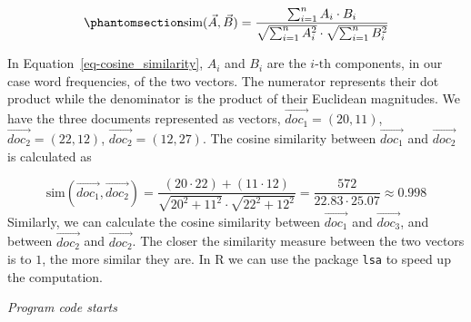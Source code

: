 \begin{equation}\phantomsection\label{eq-cosine_similarity}{
\text{sim}(\vec{A}, \vec{B}) = \frac{\sum_{i=1}^n A_i \cdot B_i}{\sqrt{\sum_{i=1}^n A_i^2} \cdot \sqrt{\sum_{i=1}^n B_i^2}}
}\end{equation}

In Equation~\ref{eq-cosine_similarity}, \(A_i\) and \(B_i\) are the
\(i\text{-th}\) components, in our case word frequencies, of the two
vectors. The numerator represents their dot product while the
denominator is the product of their Euclidean magnitudes. We have the
three documents represented as vectors, \(\vec{doc_1} = (20, 11)\),
\(\vec{doc_2} = (22, 12)\), \(\vec{doc_2} = (12, 27)\). The cosine
similarity between \(\vec{doc_1}\) and \(\vec{doc_2}\) is calculated
as

\[
\text{sim}(\vec{doc_1}, \vec{doc_2}) = \frac{(20 \cdot 22) + (11 \cdot 12)}{\sqrt{20^2 + 11^2} \cdot \sqrt{22^2 + 12^2}}
= \frac{572}{22.83 \cdot 25.07} \approx 0.998
\] Similarly, we can calculate the cosine similarity between
\(\vec{doc_1}\) and \(\vec{doc_3}\), and between \(\vec{doc_2}\) and
\(\vec{doc_2}\). The closer the similarity measure between the two vectors
is to \(1\), the more similar they are. In R we can use the package
\texttt{lsa} to speed up the computation.

\emph{Program code starts}

\begin{Shaded}
\begin{Highlighting}[]

\OtherTok{\textless{}{-}} \NormalTok{(}\NormalTok{, }\NormalTok{)}
\OtherTok{\textless{}{-}} \NormalTok{(}\NormalTok{, }\NormalTok{)}
\OtherTok{\textless{}{-}} \NormalTok{(}\NormalTok{, }\NormalTok{)}

\OtherTok{\textless{}{-}} 

\OtherTok{\textless{}{-}} \NormalTok{(}

\end{Highlighting}
\end{Shaded}

